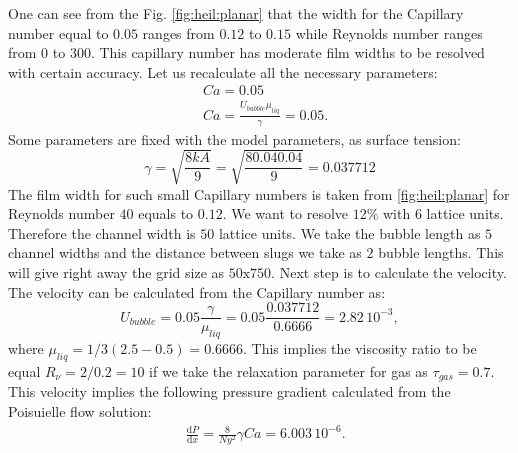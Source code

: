 \documentclass{article}
\begin{document}
One can see from the Fig. \ref{fig:heil:planar} that the width for the
Capillary number equal to $0.05$ ranges from $0.12$ to $0.15$ while Reynolds
number ranges from $0$ to $300$. This capillary number has moderate film widths
to be resolved with certain accuracy. Let us recalculate all the necessary
parameters:
\begin{equation}
\begin{aligned}
&Ca=0.05\\
&Ca=\frac{U_{bubble} \mu_{liq}}{\gamma}=0.05.
\end{aligned}
\end{equation}
Some parameters are fixed with the model parameters, as surface tension:
\begin{equation}
\gamma=\sqrt{\frac{8 k A}{9}}=\sqrt{\frac{8 0.04 0.04}{9}}=0.037712
\end{equation}
The film width for such small Capillary numbers is taken from
\ref{fig:heil:planar} for Reynolds number $40$ equals to $0.12$. We want to
resolve $12\%$ with $6$ lattice units. Therefore the channel
width is $50$ lattice units. We take the bubble length as $5$ channel widths
and the distance between slugs we take as $2$ bubble lengths. This will give
right away the grid size as $50\mathrm{x}750$. Next step is to calculate the
velocity. The velocity can be calculated from the Capillary number as:
\begin{equation}
U_{bubble}=0.05 \frac{\gamma}{\mu_{liq}}=0.05 \frac{0.037712}{0.6666}=2.82\,
10^{-3},
\end{equation}
where $\mu_{liq}=1/3 (2.5-0.5)=0.6666$. This implies the viscosity ratio to be
equal $R_{\nu}=2/0.2=10$ if we take the relaxation parameter for gas as
$\tau_{gas}=0.7$.
This velocity implies the following pressure gradient calculated from the
Poisuielle flow solution:
\begin{equation}
\begin{aligned}
&\frac{\mathrm{d}P}{\mathrm{d}x}=\frac{8}{Ny^2}\gamma Ca=6.003\,10^{-6}.
\end{aligned}
\end{equation}
\end{document}

